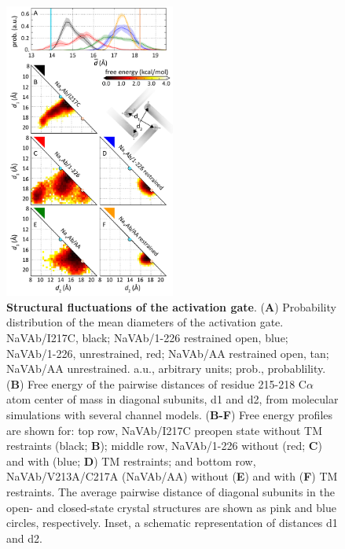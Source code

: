\begin{refsection}
{\begin{figure}[!htb]
\centering
\includegraphics[width=0.5\textwidth]{navopen/NavOFig9}
\caption[Structural fluctuations of the activation gate]{\textbf{Structural fluctuations of the activation gate}. (\textbf{A}) Probability distribution of the mean diameters of the activation gate. NaVAb/I217C, black; NaVAb/1-226 restrained open, blue; NaVAb/1-226, unrestrained, red; NaVAb/AA restrained open, tan; NaVAb/AA unrestrained. a.u., arbitrary units; prob., probablility. (\textbf{B}) Free energy of the pairwise distances of residue 215-218 C$\alpha$ atom center of mass in diagonal subunits, d1 and d2, from molecular simulations with several channel models. (\textbf{B-F}) Free energy profiles are shown for: top row, NaVAb/I217C preopen state without TM restraints (black; \textbf{B}); middle row, NaVAb/1-226 without (red; \textbf{C}) and with (blue; \textbf{D}) TM restraints; and bottom row, NaVAb/V213A/C217A (NaVAb/AA) without (\textbf{E}) and with (\textbf{F}) TM restraints. The average pairwise distance of diagonal subunits in the open- and closed-state crystal structures are shown as pink and blue circles, respectively. Inset, a schematic representation of distances d1 and d2.}
\label{fig:navofig9}
\end{figure}

}
\end{refsection}
